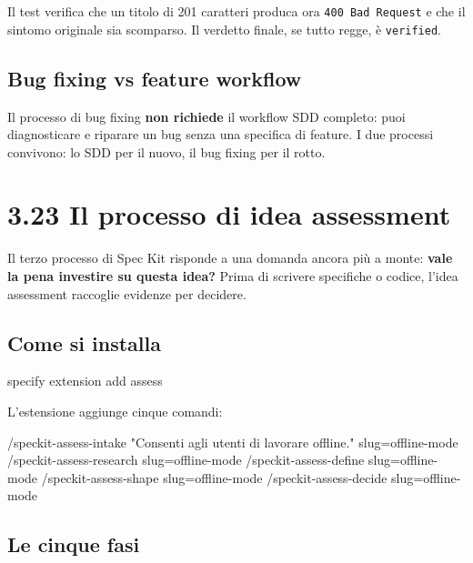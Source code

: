 \documentclass[
  italian,
  10pt,
]{book}
\newenvironment{Shaded}{\begin{snugshade}}{\end{snugshade}}
\newcommand{\ExtensionTok}[1]{#1}
\newcommand{\NormalTok}[1]{#1}
\begin{document}
Il test verifica che un titolo di 201 caratteri produca ora
\texttt{400\ Bad\ Request} e che il sintomo originale sia scomparso. Il
verdetto finale, se tutto regge, è \texttt{verified}.

\subsection{Bug fixing vs feature
workflow}\label{bug-fixing-vs-feature-workflow}

Il processo di bug fixing \textbf{non richiede} il workflow SDD
completo: puoi diagnosticare e riparare un bug senza una specifica di
feature. I due processi convivono: lo SDD per il nuovo, il bug fixing
per il rotto.

\section{3.23 Il processo di idea
assessment}\label{il-processo-di-idea-assessment}

Il terzo processo di Spec Kit risponde a una domanda ancora più a monte:
\textbf{vale la pena investire su questa idea?} Prima di scrivere
specifiche o codice, l'idea assessment raccoglie evidenze per decidere.

\subsection{Come si installa}\label{come-si-installa-1}

\begin{Shaded}
\begin{Highlighting}[]
\ExtensionTok{specify}\NormalTok{ extension add assess}
\end{Highlighting}
\end{Shaded}

L'estensione aggiunge cinque comandi:

\begin{Shaded}
\begin{Highlighting}[]
\NormalTok{/speckit{-}assess{-}intake  "Consenti agli utenti di lavorare offline." slug=offline{-}mode}
\NormalTok{/speckit{-}assess{-}research slug=offline{-}mode}
\NormalTok{/speckit{-}assess{-}define  slug=offline{-}mode}
\NormalTok{/speckit{-}assess{-}shape   slug=offline{-}mode}
\NormalTok{/speckit{-}assess{-}decide  slug=offline{-}mode}
\end{Highlighting}
\end{Shaded}

\subsection{Le cinque fasi}\label{le-cinque-fasi}
\end{document}
